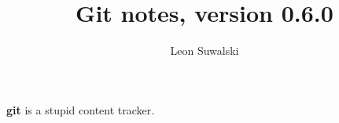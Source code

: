 \documentclass{charun}
\title{Git notes, version 0.6.0}
\author{Leon Suwalski}
\begin{document}
\begin{multicols*}{2}
\maketitle
\raggedright

\textbf{git} is a stupid content tracker.





























\end{multicols*}
\end{document}
